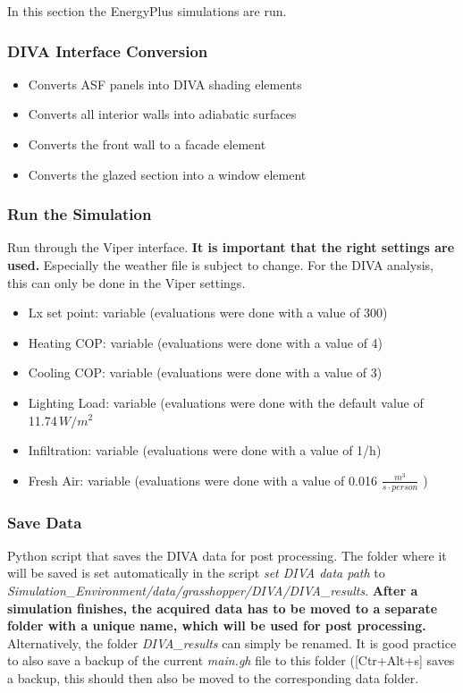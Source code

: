 	In this section the EnergyPlus simulations are run.

		\subsubsection{DIVA Interface Conversion}
		\begin{itemize}
		\item{Converts ASF panels into DIVA shading elements}
		\item{Converts all interior walls into adiabatic surfaces}
		\item{Converts the front wall to a facade element}
		\item{Converts the glazed section into a window element}
		\end{itemize}

		\subsubsection{Run the Simulation}
		Run through the Viper interface. {\bf It is important that the right settings are used.} Especially the weather file is subject to change. For the DIVA analysis, this can only be done in the Viper settings. 
		\begin{itemize}
		\item{Lx set point: variable (evaluations were done with a value of 300)}
		\item{Heating COP: variable (evaluations were done with a value of 4)}
		\item{Cooling COP: variable (evaluations were done with a value of 3)}
		\item{Lighting Load: variable (evaluations were done with the default value of 11.74\,$W/m^2$}
		\item{Infiltration: variable (evaluations were done with a value of 1/h)}
		\item{Fresh Air: variable (evaluations were done with a value of 0.016 $\frac{m^3}{s\cdot person}$ )}
		\end{itemize}

		\subsubsection{Save Data}
		Python script that saves the DIVA data for post processing. The folder where it will be saved is set automatically in the script \emph{set DIVA data path} to \emph{Simulation\_Environment/data/grasshopper/DIVA/DIVA\_results}. {\bf After a simulation finishes, the acquired data has to be moved to a separate folder with a unique name, which will be used for post processing.} Alternatively, the folder \emph{DIVA\_results} can simply be renamed. It is good practice to also save a backup of the current \emph{main.gh} file to this folder ([Ctr+Alt+s] saves a backup, this should then also be moved to the corresponding data folder. 

